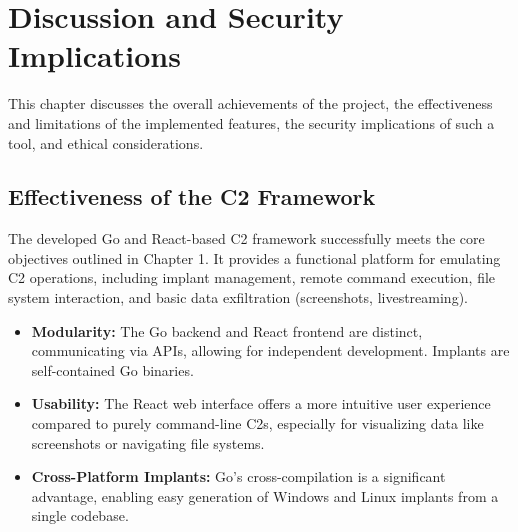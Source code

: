 \chapter{Discussion and Security Implications}
\label{chap:discussion}

This chapter discusses the overall achievements of the project, the effectiveness and limitations of the implemented features, the security implications of such a tool, and ethical considerations.

\section{Effectiveness of the C2 Framework}
The developed Go and React-based C2 framework successfully meets the core objectives outlined in Chapter 1. It provides a functional platform for emulating C2 operations, including implant management, remote command execution, file system interaction, and basic data exfiltration (screenshots, livestreaming).
\begin{itemize}
    \item \textbf{Modularity:} The Go backend and React frontend are distinct, communicating via APIs, allowing for independent development. Implants are self-contained Go binaries.
    \item \textbf{Usability:} The React web interface offers a more intuitive user experience compared to purely command-line C2s, especially for visualizing data like screenshots or navigating file systems.
    \item \textbf{Cross-Platform Implants:} Go's cross-compilation is a significant advantage, enabling easy generation of Windows and Linux implants from a single codebase.
\end{itemize}

